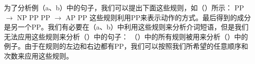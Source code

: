 为了分析例（a、b）中的句子，我们可以提出下面这些规则，如（）所示：
\eal
\ex PP $\to$ NP PP
\ex PP $\to$ AP PP
\zl
这些规则利用PP来表示动作的方式。最后得到的成分是另一个PP。我们有必要在（a、b）中利用这些规则来分析介词短语，但是我们无法应用这些规则来分析（）中的句子：
\eal
{}
\zl
（）中的所有规则被用来分析（）中的例子。由于在规则的左边和右边都有PP，我们可以按照我们所希望的任意顺序和次数来应用这些规则。


